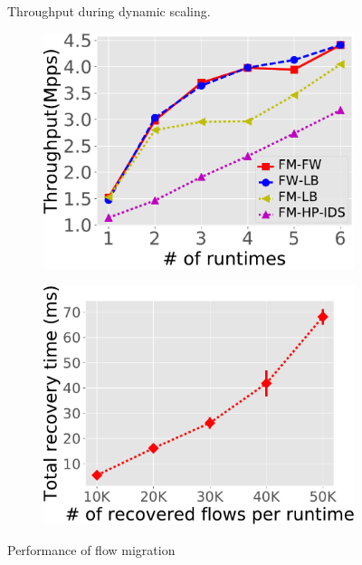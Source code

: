 \begin{figure}[!t]
\begin{center}
\begin{minipage}[t]{0.35\linewidth}
\vspace*{-2mm}
	\caption{Throughput during dynamic scaling.}
\label{fig:normal-case-scale}
\end{minipage}
\hfill
\begin{minipage}[t]{0.62\linewidth}
 \begin{subfigure}[t]{0.48\linewidth}
		\centering
		\includegraphics[width=\columnwidth]{figure/ReplicaTP.pdf}
		\caption{}\label{fig:rep-scale}
	 \end{subfigure}\hfill
	 \begin{subfigure}[t]{0.49\linewidth}
	\centering
		\includegraphics[width=\columnwidth]{figure/Recover.pdf}
		\caption{}\label{fig:rep-recovery} \end{subfigure}
	\caption{Performance of flow migration}
\label{fig:rep-perf}
\end{minipage}
\end{center}
\end{figure}


